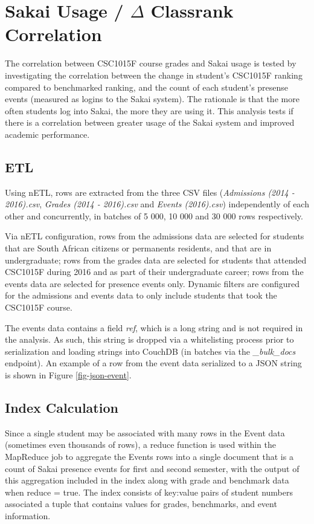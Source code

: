 \section{Sakai Usage / \texorpdfstring{$\Delta$}{Lg} Classrank Correlation}
The correlation between CSC1015F course grades and Sakai usage is tested by investigating the correlation between the change in student's CSC1015F ranking compared to benchmarked ranking, and the count of each student's presense events (measured as logins to the Sakai system). The rationale is that the more often students log into Sakai, the more they are using it. This analysis tests if there is a correlation between greater usage of the Sakai system and improved academic performance.

\subsection{ETL}
Using nETL, rows are extracted from the three CSV files (\textit{Admissions (2014 - 2016).csv}, \textit{Grades (2014 - 2016).csv} and \textit{Events (2016).csv}) independently of each other and concurrently, in batches of 5 000, 10 000 and 30 000 rows respectively.

Via nETL configuration, rows from the admissions data are selected for students that are South African citizens or permanents residents, and that are in undergraduate; rows from the grades data are selected for students that attended CSC1015F during 2016 and as part of their undergraduate career; rows from the events data are selected for presence events only. Dynamic filters are configured for the admissions and events data to only include students that took the CSC1015F course.

The events data contains a field \textit{ref}, which is a long string and is not required in the analysis. As such, this string is dropped via a whitelisting process prior to serialization and loading strings into CouchDB (in batches via the \textit{\_bulk\_docs} endpoint). An example of a row from the event data serialized to a JSON string is shown in Figure \ref{fig-json-event}.



\subsection{Index Calculation}
Since a single student may be associated with many rows in the Event data (sometimes even thousands of rows), a reduce function is used within the MapReduce job to aggregate the Events rows into a single document that is a count of Sakai presence events for first and second semester, with the output of this aggregation included in the index along with grade and benchmark data when reduce = true. The index consists of key:value pairs of student numbers associated a tuple that contains values for grades, benchmarks, and event information.

